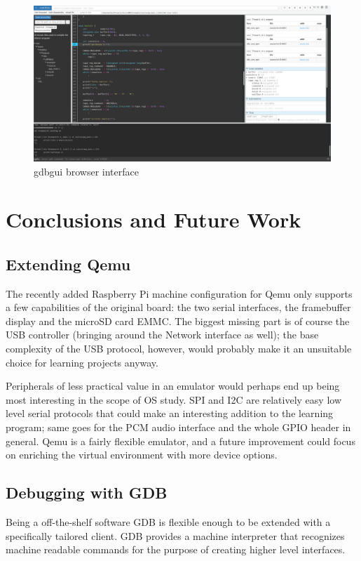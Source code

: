\documentclass[12pt,a4paper,openright,twoside]{report}
\begin{document}
 \begin{figure}[t]
 \includegraphics[scale=0.34,angle=-90,origin=c]{tesi4.png}
 \caption[Figure 4]{gdbgui browser interface}\label{fig:gdbgui}
 \end{figure}





\clearpage{\pagestyle{empty}\cleardoublepage}
\chapter{Conclusions and Future Work}
\section{Extending Qemu}
The recently added Raspberry Pi machine configuration for Qemu only supports a few
capabilities of the original board: the two serial interfaces, the framebuffer
display and the microSD card EMMC.
The biggest missing part is of course the USB controller (bringing around the
Network interface as well); the base complexity of the USB protocol, however,
 would probably make it an unsuitable choice for learning projects anyway.

Peripherals of less practical value in an emulator would perhaps end up being
most interesting in the scope of OS study. SPI and I2C are relatively
easy low level serial protocols that could make an interesting addition to the
learning program; same goes for the PCM audio interface and the whole GPIO 
header in general.
Qemu is a fairly flexible emulator, and a future improvement could focus on 
enriching the virtual environment with more device options.

\section{Debugging with GDB}
Being a off-the-shelf software GDB is flexible enough to be extended with 
a specifically tailored client. GDB provides a machine interpreter that recognizes
machine readable commands for the purpose of creating higher level interfaces.
\end{document}
